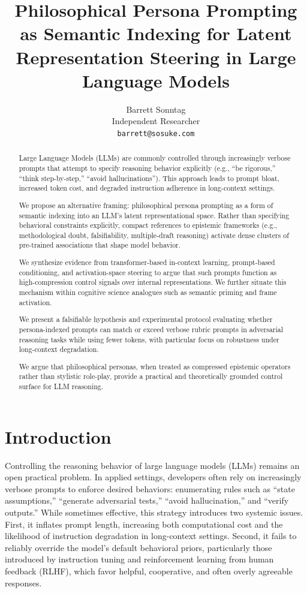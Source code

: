\documentclass[11pt]{article}
\title{Philosophical Persona Prompting as Semantic Indexing for Latent Representation Steering in Large Language Models}
\author{
  Barrett Sonntag \\
  Independent Researcher \\
  \texttt{barrett@sosuke.com}
}
\begin{document}
\maketitle

\begin{abstract}
Large Language Models (LLMs) are commonly controlled through increasingly verbose prompts that attempt to specify reasoning behavior explicitly (e.g., “be rigorous,” “think step-by-step,” “avoid hallucinations”). This approach leads to prompt bloat, increased token cost, and degraded instruction adherence in long-context settings. 

We propose an alternative framing: philosophical persona prompting as a form of semantic indexing into an LLM’s latent representational space. Rather than specifying behavioral constraints explicitly, compact references to epistemic frameworks (e.g., methodological doubt, falsifiability, multiple-draft reasoning) activate dense clusters of pre-trained associations that shape model behavior. 

We synthesize evidence from transformer-based in-context learning, prompt-based conditioning, and activation-space steering to argue that such prompts function as high-compression control signals over internal representations. We further situate this mechanism within cognitive science analogues such as semantic priming and frame activation. 

We present a falsifiable hypothesis and experimental protocol evaluating whether persona-indexed prompts can match or exceed verbose rubric prompts in adversarial reasoning tasks while using fewer tokens, with particular focus on robustness under long-context degradation. 

We argue that philosophical personas, when treated as compressed epistemic operators rather than stylistic role-play, provide a practical and theoretically grounded control surface for LLM reasoning.
\end{abstract}

\section{Introduction}

Controlling the reasoning behavior of large language models (LLMs) remains an open practical problem. In applied settings, developers often rely on increasingly verbose prompts to enforce desired behaviors: enumerating rules such as “state assumptions,” “generate adversarial tests,” “avoid hallucination,” and “verify outputs.” While sometimes effective, this strategy introduces two systemic issues. First, it inflates prompt length, increasing both computational cost and the likelihood of instruction degradation in long-context settings. Second, it fails to reliably override the model’s default behavioral priors, particularly those introduced by instruction tuning and reinforcement learning from human feedback (RLHF), which favor helpful, cooperative, and often overly agreeable responses.
\end{document}
